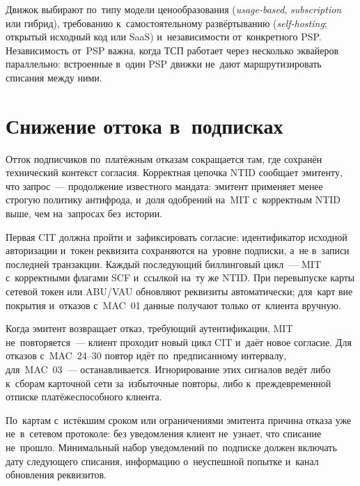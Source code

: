 Движок выбирают по~типу модели ценообразования
(\textit{usage-based}, \textit{subscription} или гибрид), требованию
к~самостоятельному развёртыванию (\textit{self-hosting}; открытый исходный код
или SaaS) и~независимости от~конкретного PSP. Независимость от~PSP важна,
когда ТСП работает через несколько эквайеров параллельно: встроенные в~один PSP
движки не~дают маршрутизировать списания между ними.

\section{Снижение оттока в~подписках}\label{sec:subscriptions-anti-churn}

Отток подписчиков по~платёжным отказам сокращается там, где сохранён
технический контекст согласия. Корректная цепочка NTID сообщает эмитенту, что
запрос~--- продолжение известного мандата: эмитент применяет менее строгую
политику антифрода, и~доля одобрений на~MIT с~корректным NTID выше, чем
на~запросах без~истории.

Первая CIT должна пройти и~зафиксировать согласие: идентификатор исходной
авторизации и~токен реквизита сохраняются на~уровне подписки, а~не в~записи
последней транзакции. Каждый последующий биллинговый цикл~--- MIT с~корректными
флагами SCF и~ссылкой на~ту же NTID. При перевыпуске карты сетевой токен или
ABU/VAU обновляют реквизиты автоматически; для~карт вне покрытия
и~отказов с~MAC~01 данные получают только от~клиента вручную.

Когда эмитент возвращает отказ, требующий аутентификации, MIT
не~повторяется~--- клиент проходит новый цикл CIT и~даёт новое согласие. Для
отказов с~MAC~24--30 повтор идёт по~предписанному интервалу, для~MAC~03~---
останавливается. Игнорирование этих сигналов ведёт либо к~сборам
карточной сети за~избыточные повторы, либо к~преждевременной отписке
платёжеспособного клиента.

По~картам с~истёкшим сроком или ограничениями эмитента причина отказа уже
не~в~сетевом протоколе: без уведомления клиент не~узнает, что списание
не~прошло. Минимальный набор уведомлений по~подписке должен включать дату следующего
списания, информацию о~неуспешной попытке и~канал обновления реквизитов.

